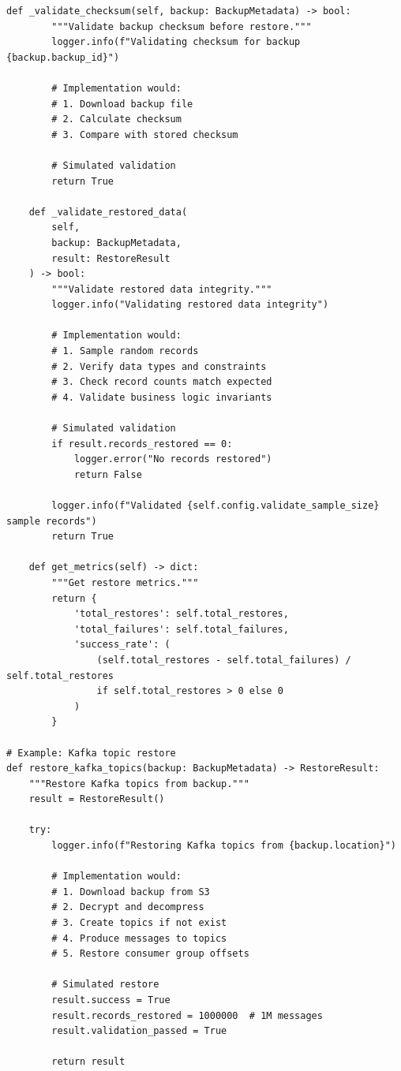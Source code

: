 \begin{lstlisting}[style=python, caption={Restore Manager with Validation}]
    def _validate_checksum(self, backup: BackupMetadata) -> bool:
        """Validate backup checksum before restore."""
        logger.info(f"Validating checksum for backup {backup.backup_id}")

        # Implementation would:
        # 1. Download backup file
        # 2. Calculate checksum
        # 3. Compare with stored checksum

        # Simulated validation
        return True

    def _validate_restored_data(
        self,
        backup: BackupMetadata,
        result: RestoreResult
    ) -> bool:
        """Validate restored data integrity."""
        logger.info("Validating restored data integrity")

        # Implementation would:
        # 1. Sample random records
        # 2. Verify data types and constraints
        # 3. Check record counts match expected
        # 4. Validate business logic invariants

        # Simulated validation
        if result.records_restored == 0:
            logger.error("No records restored")
            return False

        logger.info(f"Validated {self.config.validate_sample_size} sample records")
        return True

    def get_metrics(self) -> dict:
        """Get restore metrics."""
        return {
            'total_restores': self.total_restores,
            'total_failures': self.total_failures,
            'success_rate': (
                (self.total_restores - self.total_failures) / self.total_restores
                if self.total_restores > 0 else 0
            )
        }

# Example: Kafka topic restore
def restore_kafka_topics(backup: BackupMetadata) -> RestoreResult:
    """Restore Kafka topics from backup."""
    result = RestoreResult()

    try:
        logger.info(f"Restoring Kafka topics from {backup.location}")

        # Implementation would:
        # 1. Download backup from S3
        # 2. Decrypt and decompress
        # 3. Create topics if not exist
        # 4. Produce messages to topics
        # 5. Restore consumer group offsets

        # Simulated restore
        result.success = True
        result.records_restored = 1000000  # 1M messages
        result.validation_passed = True

        return result


\end{lstlisting}
